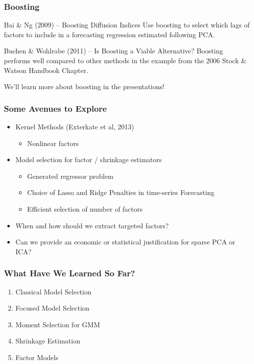 \documentclass[handout]{beamer}
\begin{document}
\begin{frame}[c]\frametitle{Boosting}
    

 \begin{block}
 	{Bai \& Ng (2009) -- Boosting Diffusion Indices}
 	Use boosting to select which lags of factors to include in a forecasting regression estimated following PCA. 
 \end{block}

 \begin{block}
 	{Buchen \& Wohlrabe (2011) -- Is Boosting a Viable Alternative?}
 	Boosting performs well compared to other methods in the example from the 2006 Stock \& Watson Handbook Chapter.
 \end{block}

\vspace{1em}
\alert{We'll learn more about boosting in the presentations!}
\end{frame}
\begin{frame}[c]\frametitle{Some Avenues to Explore}
   
\begin{itemize}
	\item Kernel Methods (Exterkate et al, 2013) 
		\begin{itemize}
			\item Nonlinear factors
		\end{itemize}
	\item Model selection for factor / shrinkage estimators
		\begin{itemize}
			\item Generated regressor problem
			\item Choice of Lasso and Ridge Penalties in time-series Forecasting 
			\item Efficient selection of number of factors
		\end{itemize}
	\item When and how should we extract targeted factors?
	\item Can we provide an economic or statistical justification for sparse PCA or ICA?
\end{itemize}

\end{frame}
\begin{frame}[c]\frametitle{What Have We Learned So Far?}
    
    \begin{enumerate}
    	\item Classical Model Selection
    	\item Focused Model Selection
    	\item Moment Selection for GMM
    	\item Shrinkage Estimation
    	\item Factor Models
    \end{enumerate}

\end{frame}
\end{document}
